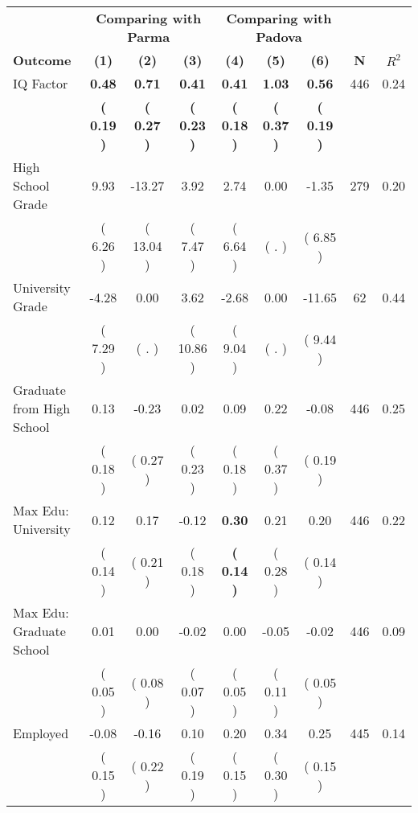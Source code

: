 \begin{tabular}{lcccccccc}
\toprule
 & \multicolumn{3}{c}{\textbf{Comparing with Parma}} & \multicolumn{3}{c}{\textbf{Comparing with Padova}} & \\
\cmidrule(lr){2-4} \cmidrule(lr){5-7} 
 \textbf{Outcome} & \textbf{(1)} & \textbf{(2)} & \textbf{(3)} & \textbf{(4)} & \textbf{(5)} & \textbf{(6)} & \textbf{N} & \textbf{$ R^2$} \\
\midrule
IQ Factor & \textbf{     0.48} & \textbf{     0.71} & \textbf{     0.41} & \textbf{     0.41} & \textbf{     1.03} & \textbf{     0.56} & 446 &       0.24 \\ 
 & \textbf{(     0.19 )} & \textbf{(     0.27 )} & \textbf{(     0.23 )} & \textbf{(     0.18 )} & \textbf{(     0.37 )} & \textbf{(     0.19 )} & \\
High School Grade &      9.93 &    -13.27 &      3.92 &      2.74 &      0.00 &     -1.35 & 279 &       0.20 \\ 
 & (     6.26 ) & (    13.04 ) & (     7.47 ) & (     6.64 ) & (        . ) & (     6.85 ) & \\
University Grade &     -4.28 &      0.00 &      3.62 &     -2.68 &      0.00 &    -11.65 & 62 &       0.44 \\ 
 & (     7.29 ) & (        . ) & (    10.86 ) & (     9.04 ) & (        . ) & (     9.44 ) & \\
Graduate from High School &      0.13 &     -0.23 &      0.02 &      0.09 &      0.22 &     -0.08 & 446 &       0.25 \\ 
 & (     0.18 ) & (     0.27 ) & (     0.23 ) & (     0.18 ) & (     0.37 ) & (     0.19 ) & \\
Max Edu: University &      0.12 &      0.17 &     -0.12 & \textbf{     0.30} &      0.21 &      0.20 & 446 &       0.22 \\ 
 & (     0.14 ) & (     0.21 ) & (     0.18 ) & \textbf{(     0.14 )} & (     0.28 ) & (     0.14 ) & \\
Max Edu: Graduate School &      0.01 &      0.00 &     -0.02 &      0.00 &     -0.05 &     -0.02 & 446 &       0.09 \\ 
 & (     0.05 ) & (     0.08 ) & (     0.07 ) & (     0.05 ) & (     0.11 ) & (     0.05 ) & \\
Employed &     -0.08 &     -0.16 &      0.10 &      0.20 &      0.34 &      0.25 & 445 &       0.14 \\ 
 & (     0.15 ) & (     0.22 ) & (     0.19 ) & (     0.15 ) & (     0.30 ) & (     0.15 ) & \\

\end{tabular}
